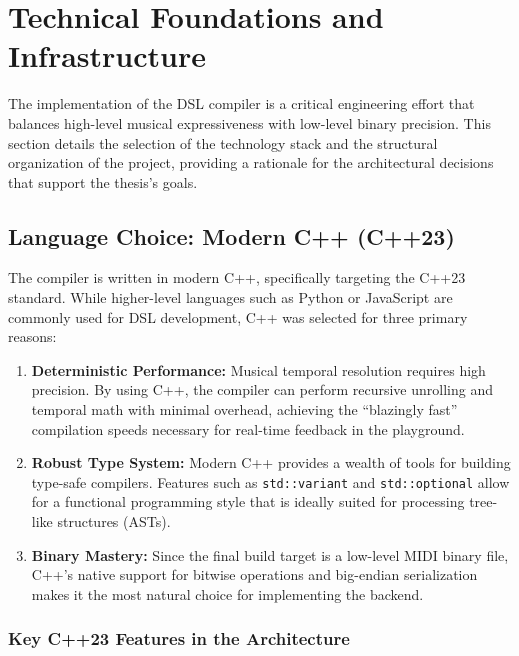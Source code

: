 \section{Technical Foundations and Infrastructure}\label{sec:implementation-foundations}

The implementation of the DSL compiler is a critical engineering effort that balances high-level musical expressiveness
with low-level binary precision.
This section details the selection of the technology stack and the structural organization of the project, providing a
rationale for the architectural decisions that support the thesis's goals.

\subsection{Language Choice: Modern C++ (C++23)}\label{subsec:language-choice:-modern-c++-(c++23)}

The compiler is written in modern C++, specifically targeting the C++23 standard.
While higher-level languages such as Python or JavaScript are commonly used for DSL development, C++ was selected for
three primary reasons:
\begin{enumerate}
  \item \textbf{Deterministic Performance:} Musical temporal resolution requires high precision.
    By using C++, the compiler can perform recursive unrolling and temporal math with minimal overhead, achieving the
    ``blazingly fast'' compilation speeds necessary for real-time feedback in the playground.
  \item \textbf{Robust Type System:} Modern C++ provides a wealth of tools for building type-safe compilers.
    Features such as \texttt{std::variant} and \texttt{std::optional} allow for a functional programming style that is
    ideally suited for processing tree-like structures (ASTs).
  \item \textbf{Binary Mastery:} Since the final build target is a low-level MIDI binary file, C++'s native support for
    bitwise operations and big-endian serialization makes it the most natural choice for implementing the backend.
\end{enumerate}

\subsubsection{Key C++23 Features in the Architecture}

